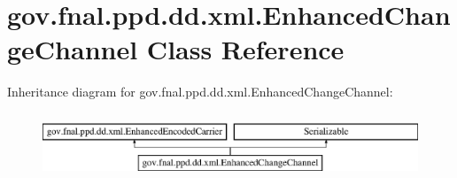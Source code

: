 \hypertarget{classgov_1_1fnal_1_1ppd_1_1dd_1_1xml_1_1EnhancedChangeChannel}{\section{gov.\-fnal.\-ppd.\-dd.\-xml.\-Enhanced\-Change\-Channel Class Reference}
\label{classgov_1_1fnal_1_1ppd_1_1dd_1_1xml_1_1EnhancedChangeChannel}
}
Inheritance diagram for gov.\-fnal.\-ppd.\-dd.\-xml.\-Enhanced\-Change\-Channel\-:\begin{figure}[H]
\begin{center}
\leavevmode
\includegraphics[height=1.978799cm]{classgov_1_1fnal_1_1ppd_1_1dd_1_1xml_1_1EnhancedChangeChannel}
\end{center}
\end{figure}
